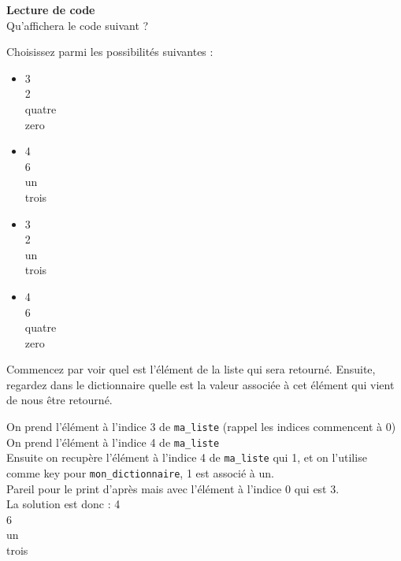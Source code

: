     \begin{Exercice}[5 minutes] \textbf{Lecture de code}\\
      	Qu'affichera le code suivant ?
      	
      	
      	
      	Choisissez parmi les possibilités suivantes :
      	
      	\begin{itemize}
      	\item 3 \\
      	2 \\
      	quatre \\
      	zero\\
      	\item 4 \\
      	6 \\
      	un \\
      	trois\\
      	\item 3 \\
      	2 \\
      	un \\
      	trois\\
      	\item 4 \\
      	6 \\
      	quatre \\
      	zero \\
      	\end{itemize}
    
        \begin{conseil}
           Commencez par voir quel est l'élément de la liste qui sera retourné. Ensuite, regardez dans le dictionnaire quelle est la valeur associée à cet élément qui vient de nous être retourné.		     
        \end{conseil}
        
        \begin{solution}
            On prend l'élément à l'indice 3 de \lstinline{ma_liste} (rappel les indices commencent à 0)\\
            On prend l'élément à l'indice 4 de \lstinline{ma_liste}\\
            Ensuite on recupère l'élément à l'indice 4 de \lstinline{ma_liste} qui 1, et on l'utilise comme key pour \lstinline{mon_dictionnaire}, 1 est associé à un. \\
            Pareil pour le print d'après mais avec l'élément à l'indice 0 qui est 3.\\
            La solution est donc : 
        4 \\
      	6 \\
      	un \\
      	trois
        \end{solution}
    \end{Exercice}
    
